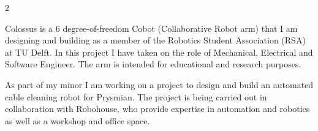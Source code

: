 \documentclass[10pt, a4paper, withhyper]{altacv}
\begin{document}

  \begin{paracol}
    {2}





     {}
    Colossus is a 6 degree-of-freedom Cobot (Collaborative Robot arm) that I am
    designing and building as a member of the Robotics Student Association (RSA)
    at TU Delft. In this project I have taken on the role of Mechanical,
    Electrical and Software Engineer. The arm is intended for educational and research
    purposes.


    \divider

     As part of my
    minor I am working on a project to design and build an automated cable cleaning
    robot for Prysmian. The project is being carried out in collaboration with
    Robohouse, who provide expertise in automation and robotics as well as a workshop
    and office space.


\end{paracol}
\end{document}
